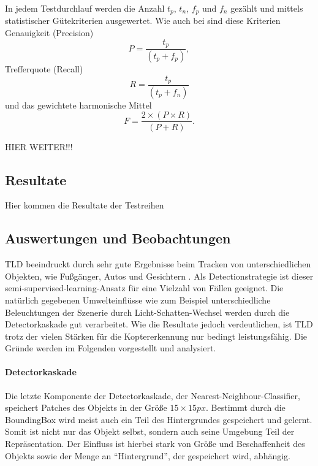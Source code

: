 	In jedem Testdurchlauf werden die Anzahl $t_p$, $t_n$, $f_p$ und $f_n$ gezählt und mittels statistischer Gütekriterien ausgewertet.
  Wie auch bei \cite{TLD} sind diese Kriterien Genauigkeit (Precision) \begin{equation} P=\frac{t_p}{(t_p + f_p)},\end{equation}
  Trefferquote (Recall) \begin{equation} R=\frac{t_p}{(t_p + f_n)} \end{equation}
  und das gewichtete harmonische Mittel \begin{equation} F=\frac{2 \times (P \times R)}{(P + R)}.\end{equation}

  HIER WEITER!!!

\subsection{Resultate}
	Hier kommen die Resultate der Testreihen

\subsection{Auswertungen und Beobachtungen}
	\label{subsec:conclusion}
	TLD beeindruckt durch sehr gute Ergebnisse beim Tracken von unterschiedlichen Objekten, wie Fußgänger, Autos und Gesichtern \cite{TLD}. Als Detectionstrategie ist dieser semi-supervised-learning-Ansatz für eine Vielzahl von Fällen geeignet. Die natürlich gegebenen Umwelteinflüsse wie zum Beispiel unterschiedliche Beleuchtungen der Szenerie durch Licht-Schatten-Wechsel werden durch die Detectorkaskade gut verarbeitet. Wie die Resultate jedoch verdeutlichen, ist TLD trotz der vielen Stärken für die Koptererkennung nur bedingt leistungsfähig. Die Gründe werden im Folgenden vorgestellt und analysiert.

	\paragraph{Detectorkaskade}
	Die letzte Komponente der Detectorkaskade, der Nearest-Neighbour-Classifier, speichert Patches des Objekts in der Größe $15\times15 px$. Bestimmt durch die BoundingBox wird meist auch ein Teil des Hintergrundes gespeichert und gelernt. Somit ist nicht nur das Objekt selbst, sondern auch seine Umgebung Teil der Repräsentation. Der Einfluss ist hierbei stark von Größe und Beschaffenheit des Objekts sowie der Menge an ``Hintergrund'', der gespeichert wird, abhängig.

